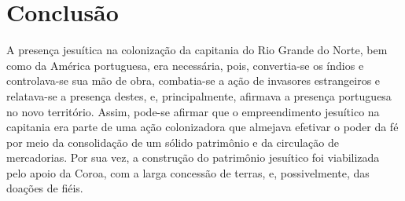 \section{Conclusão}

A presença jesuítica na colonização da capitania do Rio Grande do Norte, bem como da América portuguesa, era necessária, pois, convertia-se os índios e controlava-se sua mão de obra, combatia-se a ação de invasores estrangeiros e relatava-se a presença destes, e, principalmente, afirmava a presença portuguesa no novo território. Assim, pode-se afirmar que o empreendimento jesuítico na capitania era parte de uma ação colonizadora que almejava efetivar o poder da fé por meio da consolidação de um sólido patrimônio e da circulação de mercadorias. Por sua vez, a construção do patrimônio jesuítico foi viabilizada pelo apoio da Coroa, com a larga concessão de terras, e, possivelmente, das doações de fiéis.

\printbibliography

